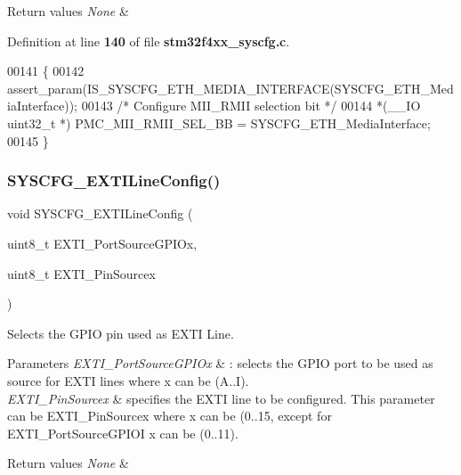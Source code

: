 \begin{DoxyRetVals}{Return values}
{\em None} & \\
\hline
\end{DoxyRetVals}


Definition at line \textbf{ 140} of file \textbf{ stm32f4xx\+\_\+syscfg.\+c}.


\begin{DoxyCode}
00141 \{ 
00142   assert_param(IS_SYSCFG_ETH_MEDIA_INTERFACE(SYSCFG\_ETH\_MediaInterface)); 
00143   \textcolor{comment}{/* Configure MII\_RMII selection bit */} 
00144   *(\_\_IO uint32\_t *) PMC_MII_RMII_SEL_BB = SYSCFG\_ETH\_MediaInterface; 
00145 \}
\end{DoxyCode}
\mbox{\label{group__SYSCFG_gafedab1f64cef720aeafeafd409ba6ae7}} 
\subsubsection{S\+Y\+S\+C\+F\+G\+\_\+\+E\+X\+T\+I\+Line\+Config()}
{\footnotesize\ttfamily void S\+Y\+S\+C\+F\+G\+\_\+\+E\+X\+T\+I\+Line\+Config (\begin{DoxyParamCaption}\item[{uint8\+\_\+t}]{E\+X\+T\+I\+\_\+\+Port\+Source\+G\+P\+I\+Ox,  }\item[{uint8\+\_\+t}]{E\+X\+T\+I\+\_\+\+Pin\+Sourcex }\end{DoxyParamCaption})}



Selects the G\+P\+IO pin used as E\+X\+TI Line. 


\begin{DoxyParams}{Parameters}
{\em E\+X\+T\+I\+\_\+\+Port\+Source\+G\+P\+I\+Ox} & \+: selects the G\+P\+IO port to be used as source for E\+X\+TI lines where x can be (A..I). \\
\hline
{\em E\+X\+T\+I\+\_\+\+Pin\+Sourcex} & specifies the E\+X\+TI line to be configured. This parameter can be E\+X\+T\+I\+\_\+\+Pin\+Sourcex where x can be (0..15, except for E\+X\+T\+I\+\_\+\+Port\+Source\+G\+P\+I\+OI x can be (0..11). \\
\hline
\end{DoxyParams}

\begin{DoxyRetVals}{Return values}
{\em None} & \\
\hline
\end{DoxyRetVals}


